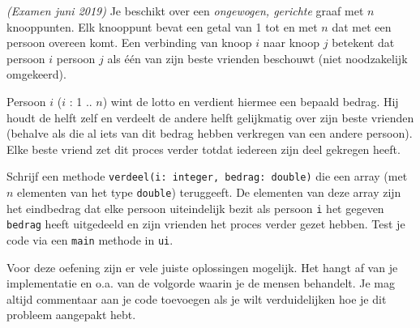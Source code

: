 \begin{oef}
\code \emph{(Examen juni 2019)} Je beschikt over een \emph{ongewogen, gerichte} graaf met $n$ knooppunten. Elk knooppunt bevat een getal van 1 tot en met $n$ dat met een persoon overeen komt. Een verbinding van knoop $i$ naar knoop $j$ betekent dat persoon $i$ persoon $j$ als één van zijn beste vrienden beschouwt (niet noodzakelijk omgekeerd).

Persoon $i$ ($i$ : 1 .. $n$) wint de lotto en verdient hiermee een bepaald bedrag. Hij houdt de helft zelf en verdeelt de andere helft gelijkmatig over zijn beste vrienden (behalve als die al iets van dit bedrag hebben verkregen van een andere persoon). Elke beste vriend zet dit proces verder totdat iedereen zijn deel gekregen heeft. 

Schrijf een methode \verb+verdeel(i: integer, bedrag: double)+ die een array (met $n$ elementen van het type \verb+double+) teruggeeft. De elementen van deze array zijn het eindbedrag dat elke persoon uiteindelijk bezit als persoon \verb/i/ het gegeven \verb/bedrag/ heeft uitgedeeld en zijn vrienden het proces verder gezet hebben. Test je code via een \verb+main+ methode in \verb+ui+.

Voor deze oefening zijn er vele juiste oplossingen mogelijk. Het hangt af van je implementatie en o.a. van de volgorde waarin je de mensen behandelt. Je mag altijd commentaar aan je code toevoegen als je wilt verduidelijken hoe je dit probleem aangepakt hebt.


\end{oef}
